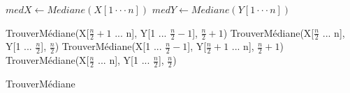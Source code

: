 \documentclass[12pt]{article}
\begin{document}
\begin{algorithm}[H]


      	\(medX \gets Mediane(X[1 \cdot\cdot\cdot  n]) \) \;
      	\(medY \gets Mediane(Y[1 \cdot\cdot\cdot  n]) \) \;


      	{
      		{
      			\Return TrouverMédiane(X[\( \frac{n}{2} +1\) ...  n], Y[1 ...  \( \frac{n}{2} -1\)], \( \frac{n}{2} +1\))
      		}
      		{
      			\Return TrouverMédiane(X[\( \frac{n}{2}\) ...  n], Y[1 ...  \( \frac{n}{2}\)], \( \frac{n}{2}\))
      		}
      	}
      	{
      		{
      			\Return TrouverMédiane(X[1 ...  \( \frac{n}{2} -1\)], Y[\( \frac{n}{2} +1\) ...  n], \( \frac{n}{2} +1\))
      		}
      		{
      			\Return TrouverMédiane(X[\( \frac{n}{2}\) ...  n], Y[1 ...  \( \frac{n}{2}\)], \( \frac{n}{2}\))
      		}
      	}


      \caption{TrouverMédiane}
\end{algorithm}
\end{document}
